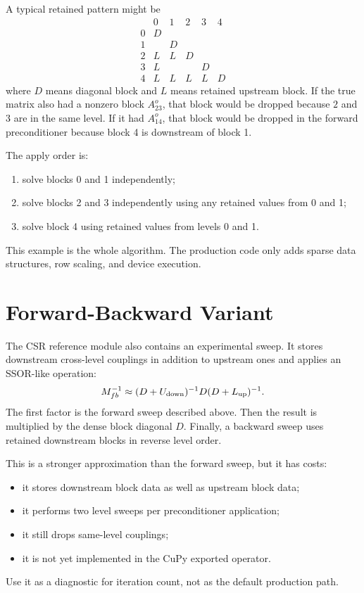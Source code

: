 \documentclass[11pt]{article}
\newcommand{\code}[1]{\texttt{\detokenize{#1}}}
\begin{document}
A typical retained pattern might be
\[
\begin{array}{c|ccccc}
       & 0 & 1 & 2 & 3 & 4 \\
\hline
  0    & D &   &   &   &   \\
  1    &   & D &   &   &   \\
  2    & L & L & D &   &   \\
  3    & L &   &   & D &   \\
  4    & L & L & L & L & D
\end{array}
\]
where \(D\) means diagonal block and \(L\) means retained upstream block.
If the true matrix also had a nonzero block \(A^o_{23}\), that block would be
dropped because \(2\) and \(3\) are in the same level.  If it had \(A^o_{14}\),
that block would be dropped in the forward preconditioner because block 4 is
downstream of block 1.

The apply order is:
\begin{enumerate}[nosep]
  \item solve blocks 0 and 1 independently;
  \item solve blocks 2 and 3 independently using any retained values from 0
        and 1;
  \item solve block 4 using retained values from levels 0 and 1.
\end{enumerate}
This example is the whole algorithm.  The production code only adds sparse data
structures, row scaling, and device execution.

\section{Forward-Backward Variant}
\label{sec:forward-backward}

The CSR reference module also contains an experimental
\code{forward_backward} sweep.  It stores downstream cross-level couplings in
addition to upstream ones and applies an SSOR-like operation:
\[
  M_{fb}^{-1} \approx (D+U_{\rm down})^{-1}D(D+L_{\rm up})^{-1}.
\]
The first factor is the forward sweep described above.  Then the result is
multiplied by the dense block diagonal \(D\).  Finally, a backward sweep uses
retained downstream blocks in reverse level order.

This is a stronger approximation than the forward sweep, but it has costs:
\begin{itemize}[nosep]
  \item it stores downstream block data as well as upstream block data;
  \item it performs two level sweeps per preconditioner application;
  \item it still drops same-level couplings;
  \item it is not yet implemented in the CuPy exported operator.
\end{itemize}
Use it as a diagnostic for iteration count, not as the default production path.
\end{document}
